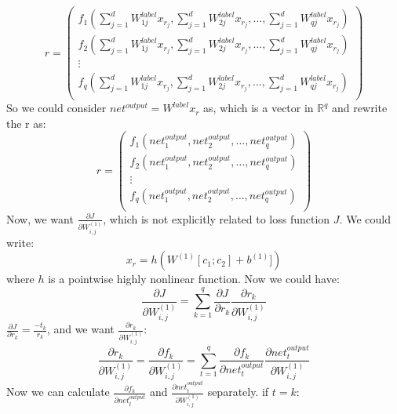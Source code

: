 \documentclass[twoside,12pt]{article}
\begin{document}
\begin{equation}
r =
\begin{pmatrix}
  f_1(\sum_{j=1}^{d}W^{label}_{1j} x_{r_j}, \sum_{j=1}^{d}W^{label}_{2j}x_{r_j},\ldots, \sum_{j=1}^{d}W^{label}_{qj}x_{r_j})\\
   f_2(\sum_{j=1}^{d}W^{label}_{1j}x_{r_j}, \sum_{j=1}^{d}W^{label}_{2j}x_{r_j},\ldots, \sum_{j=1}^{d}W^{label}_{qj}x_{r_j}) \\
  \vdots  \\
    f_q(\sum_{j=1}^{d}W^{label}_{1j}x_{r_j}, \sum_{j=1}^{d}W^{label}_{2j}x_{r_j},\ldots, \sum_{j=1}^{d}W^{label}_{qj}x_{r_j})\\
 \end{pmatrix}
\end{equation}
 So we could consider $net^{output}=W^{label}x_r$ as, which is a vector in $\mathbb{R}^q$ and rewrite the r as:
 \begin{equation}
 r=
 \begin{pmatrix}
 f_1(net^{output}_1,net^{output}_2,\ldots,net^{output}_q)\\
  f_2(net^{output}_1,net^{output}_2,\ldots,net^{output}_q)\\
\vdots \\
 f_q(net^{output}_1,net^{output}_2,\ldots,net^{output}_q)\\
 \end{pmatrix}
\end{equation}
Now, we want $\frac{\partial J}{\partial W^{(1)}_{i,j}}$, which is not explicitly related to loss function $J$. We could write:
\begin{equation}
x_r=h(W^{(1)}[c_1;c_2]+b^{(1)}])
\end{equation} 
where $h$ is a pointwise highly nonlinear function. Now we could have:
\begin{equation}
\frac{\partial J}{\partial W^{(1)}_{i,j}}=\sum_{k=1}^q\frac{\partial J}{\partial r_k}\frac{\partial r_k}{\partial W^{(1)}_{i,j}}
\end{equation}
$\frac{\partial J}{\partial r_k}=\frac{-t_k}{r_k}$, and we want $\frac{\partial r_k}{\partial W^{(1)}_{i,j}}$:
\begin{equation}
\frac{\partial r_k}{\partial W^{(1)}_{i,j}}=\frac{\partial f_k}{\partial W^{(1)}_{i,j}}=\sum_{t=1}^{q}\frac{\partial f_k}{\partial net^{output}_{t}}\frac{\partial net^{output}_t}{\partial W^{(1)}_{i,j}}
\end{equation}
Now we can calculate $\frac{\partial f_k}{\partial net^{output}_{t}}$ and $\frac{\partial net^{output}_t}{\partial W^{(1)}_{i,j}}$ separately. if $t=k$:
\end{document}
